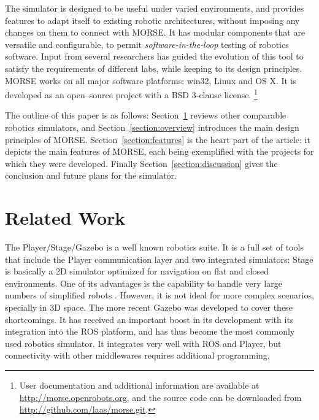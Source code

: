 \documentclass{llncs}
\newcommand{\NOTE}[1]{\textbf{NOTE:} \emph{#1} }
\begin{document}

The simulator is designed to be useful under varied environments, and provides
features to adapt itself to existing robotic architectures, without imposing
any changes on them to connect with MORSE. It has modular components
that are versatile and configurable, to permit \emph{software-in-the-loop}
testing of robotics software.
Input from several researchers has guided the evolution of this tool to satisfy
the requirements of different labs, while keeping to its design principles.
MORSE works on all major software platforms: win32, Linux and OS X. It is
developed as an open--source project with a BSD 3-clause license.
\footnote{User documentation and additional information are available at
\url{http://morse.openrobots.org}, and the source code can be downloaded from
\url{http://github.com/laas/morse.git}.} 

The outline of this paper is as follows: Section~\ref{section:othersims} reviews
other comparable robotics simulators, and Section~\ref{section:overview}
introduces the main design principles of MORSE. Section~\ref{section:features}
is the heart part of the article: it depicts the main features of MORSE, each
being exemplified with the projects for which they were developed. Finally
Section~\ref{section:discussion} gives the conclusion and future plans for the
simulator.

\section{Related Work}
\label{section:othersims}

The Player/Stage/Gazebo\cite{psg-1232} is a well known robotics suite.
It is a full set of tools that include the Player communication layer
and two integrated simulators: Stage \cite{Gerkey03theplayer/stage} is basically a
2D simulator optimized for navigation on flat and closed environments.
One of its advantages is the capability to handle very large numbers of
simplified robots \cite{springerlink:10.1007/s11721-008-0014-4}. However, it is
not ideal for more complex scenarios, specially in 3D space. The more recent
Gazebo \cite{Koenig04designand} was developed to cover these shortcomings.
It has received an important boost in its development with its integration
into the ROS platform, and has thus become the most commonly used robotics
simulator. It integrates very well with ROS and Player, but connectivity with
other middlewares requires additional programming.
\end{document}
